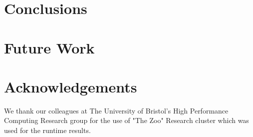 \documentclass[sigconf,preprint,9pt]{acmart}
\begin{document}
\section{Conclusions}


\section{Future Work}

\section*{Acknowledgements}
We thank our colleagues at The University of Bristol's High Performance Computing Research group for the use of "The Zoo" Research cluster which was used for the runtime results.





\newpage
\listoftodos[Notes]
\end{document}
